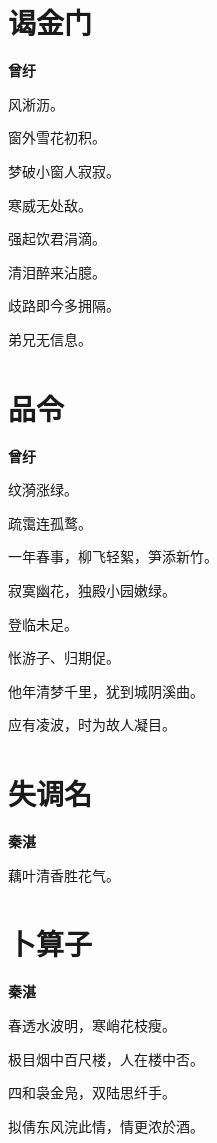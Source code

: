 \documentclass[12pt,a4paper]{ctexbook}
\begin{document}
\section{谒金门}
\textbf{曾纡}\par\vspace{0.5em}
风淅沥。\par
窗外雪花初积。\par
梦破小窗人寂寂。\par
寒威无处敌。\par
强起饮君涓滴。\par
清泪醉来沾臆。\par
歧路即今多拥隔。\par
弟兄无信息。\par

\section{品令}
\textbf{曾纡}\par\vspace{0.5em}
纹漪涨绿。\par
疏霭连孤鹜。\par
一年春事，柳飞轻絮，笋添新竹。\par
寂寞幽花，独殿小园嫩绿。\par
登临未足。\par
怅游子、归期促。\par
他年清梦千里，犹到城阴溪曲。\par
应有凌波，时为故人凝目。\par

\section{失调名}
\textbf{秦湛}\par\vspace{0.5em}
藕叶清香胜花气。\par

\section{卜算子}
\textbf{秦湛}\par\vspace{0.5em}
春透水波明，寒峭花枝瘦。\par
极目烟中百尺楼，人在楼中否。\par
四和袅金凫，双陆思纤手。\par
拟倩东风浣此情，情更浓於酒。\par
\end{document}
